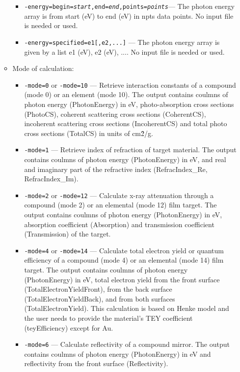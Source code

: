 \begin{itemize}
\begin{itemize}
\begin{itemize}
          \item {\tt -energy=begin={\em start},end={\em end},points={\em points}}---
                  The photon energy array is from start (eV) to end (eV) in npts data points. No input file is needed or used. 
          \item {\tt -energy=specified={e1[,e2,...]}} ---
                  The photon energy array is given by a list e1 (eV), e2 (eV), .... No input file is needed or used. 
         \end{itemize}
    \item Mode of calculation: 
        \begin{itemize}
          \item {\tt -mode=0}  or {\tt -mode=10} ---
            Retrieve interaction constants of a compound (mode 0) or an element (mode 10). The output contains coulmns of photon energy (PhotonEnergy) in eV, photo-absorption cross sections (PhotoCS), coherent scattering cross sections (CoherentCS), incoherent scattering cross sections (IncoherentCS) and total photo cross sections (TotalCS) in units of cm\^{2}/g. 
          \item {\tt -mode=1} ---
            Retrieve index of refraction of target material. The output contains coulmns of photon energy (PhotonEnergy) in eV, and real and imaginary part of the refractive index (RefracIndex\_Re, RefracIndex\_Im). 
          \item {\tt -mode=2}  or {\tt -mode=12} ---
            Calculate x-ray attenuation through a compound (mode 2) or an elemental (mode 12) film target. The output contains coulmns of photon energy (PhotonEnergy) in eV, absorption coefficient (Absorption) and transmission coefficient (Transmission) of the target. 
           \item {\tt -mode=4}  or {\tt -mode=14} ---
            Calculate total electron yield or quantum efficiency of a compound (mode 4) or an elemental (mode 14) film target. The output contains coulmns of photon energy (PhotonEnergy) in eV, total electron yield from the front surface (TotalElectronYieldFront), from the back surface (TotalElectronYieldBack), and from both surfaces (TotalElectronYield). This calculation is based on Henke model and the user needs to provide the material's TEY coefficient (teyEfficiency) except for Au. 
            \item {\tt -mode=6} ---
              Calculate reflectivity of a compound mirror. The output contains coulmns of photon energy (PhotonEnergy) in eV and reflectivity from the front surface (Reflectivity). 

\end{itemize}
\end{itemize}
\end{itemize}
